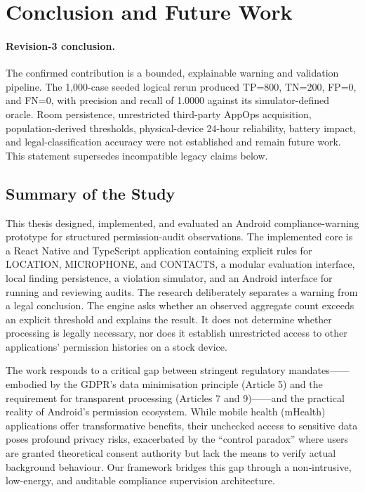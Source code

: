\newpage
\section{Conclusion and Future Work}

\paragraph{Revision-3 conclusion.} The confirmed contribution is a bounded, explainable warning and validation pipeline. The 1,000-case seeded logical rerun produced TP=800, TN=200, FP=0, and FN=0, with precision and recall of 1.0000 against its simulator-defined oracle. Room persistence, unrestricted third-party AppOps acquisition, population-derived thresholds, physical-device 24-hour reliability, battery impact, and legal-classification accuracy were not established and remain future work. This statement supersedes incompatible legacy claims below.

\subsection{Summary of the Study}

This thesis designed, implemented, and evaluated an Android compliance-warning prototype for structured permission-audit observations. The implemented core is a React Native and TypeScript application containing explicit rules for LOCATION, MICROPHONE, and CONTACTS, a modular evaluation interface, local finding persistence, a violation simulator, and an Android interface for running and reviewing audits. The research deliberately separates a warning from a legal conclusion. The engine asks whether an observed aggregate count exceeds an explicit threshold and explains the result. It does not determine whether processing is legally necessary, nor does it establish unrestricted access to other applications' permission histories on a stock device.

The work responds to a critical gap between stringent regulatory mandates——embodied by the GDPR's data minimisation principle (Article 5) and the requirement for transparent processing (Articles 7 and 9)——and the practical reality of Android's permission ecosystem. While mobile health (mHealth) applications offer transformative benefits, their unchecked access to sensitive data poses profound privacy risks, exacerbated by the ``control paradox'' where users are granted theoretical consent authority but lack the means to verify actual background behaviour. Our framework bridges this gap through a non‑intrusive, low‑energy, and auditable compliance supervision architecture.

